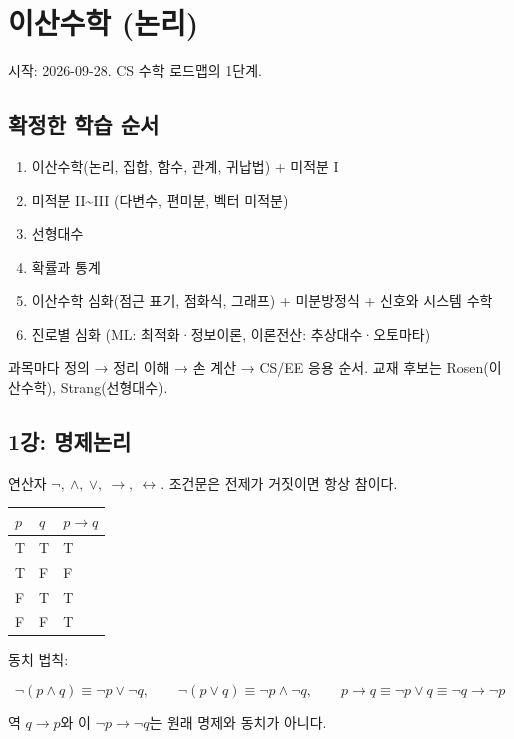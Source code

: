 \section{이산수학 (논리)}

시작: 2026-09-28. CS 수학 로드맵의 1단계.

\subsection{확정한 학습 순서}

\begin{enumerate}
\def\labelenumi{\arabic{enumi}.}
\tightlist
\item
  이산수학(논리, 집합, 함수, 관계, 귀납법) + 미적분 I
\item
  미적분 II\textasciitilde III (다변수, 편미분, 벡터 미적분)
\item
  선형대수
\item
  확률과 통계
\item
  이산수학 심화(점근 표기, 점화식, 그래프) + 미분방정식 + 신호와 시스템
  수학
\item
  진로별 심화 (ML: 최적화·정보이론, 이론전산: 추상대수·오토마타)
\end{enumerate}

과목마다 정의 → 정리 이해 → 손 계산 → CS/EE 응용 순서. 교재 후보는
Rosen(이산수학), Strang(선형대수).

\subsection{1강: 명제논리}

연산자 \(\neg,\ \wedge,\ \vee,\ \to,\ \leftrightarrow\). 조건문은 전제가
거짓이면 항상 참이다.

\begin{longtable}[]{@{}lll@{}}
\toprule\noalign{}
\(p\) & \(q\) & \(p\to q\) \\
\midrule\noalign{}
\endhead
\bottomrule\noalign{}
\endlastfoot
T & T & T \\
T & F & F \\
F & T & T \\
F & F & T \\
\end{longtable}

동치 법칙:

\[
\neg(p\wedge q)\equiv\neg p\vee\neg q,\qquad \neg(p\vee q)\equiv\neg p\wedge\neg q,\qquad p\to q\equiv\neg p\vee q\equiv\neg q\to\neg p
\]

역 \(q\to p\)와 이 \(\neg p\to\neg q\)는 원래 명제와 동치가 아니다.

